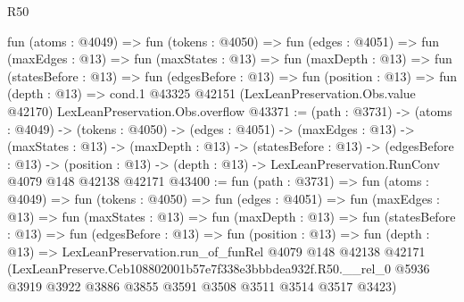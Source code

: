 \begin{lexlean}{R50}
\begin{coremodule}
  fun (atoms : @4049) =>
  fun (tokens : @4050) =>
  fun (edges : @4051) =>
  fun (maxEdges : @13) =>
  fun (maxStates : @13) =>
  fun (maxDepth : @13) =>
  fun (statesBefore : @13) =>
  fun (edgesBefore : @13) =>
  fun (position : @13) =>
  fun (depth : @13) =>
  cond.{1} @43325 @42151 (LexLeanPreservation.Obs.value @42170) LexLeanPreservation.Obs.overflow
@43371 := (path : @3731) ->
  (atoms : @4049) ->
  (tokens : @4050) ->
  (edges : @4051) ->
  (maxEdges : @13) ->
  (maxStates : @13) ->
  (maxDepth : @13) ->
  (statesBefore : @13) ->
  (edgesBefore : @13) ->
  (position : @13) -> (depth : @13) -> LexLeanPreservation.RunConv @4079 @148 @42138 @42171
@43400 := fun (path : @3731) =>
  fun (atoms : @4049) =>
  fun (tokens : @4050) =>
  fun (edges : @4051) =>
  fun (maxEdges : @13) =>
  fun (maxStates : @13) =>
  fun (maxDepth : @13) =>
  fun (statesBefore : @13) =>
  fun (edgesBefore : @13) =>
  fun (position : @13) =>
  fun (depth : @13) =>
  LexLeanPreservation.run_of_funRel
    @4079
    @148
    @42138
    @42171
    (LexLeanPreserve.Ceb108802001b57e7f338e3bbbdea932f.R50.__rel_0
      @5936
      @3919
      @3922
      @3886
      @3855
      @3591
      @3508
      @3511
      @3514
      @3517
      @3423)
\end{coremodule}
\end{lexlean}

